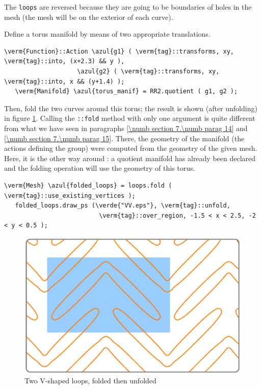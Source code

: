 The {\small\tt loops} are reversed because they are going to be boundaries of holes
in the mesh (the mesh will be on the exterior of each curve).

Define a torus manifold by means of two appropriate translations.

\begin{Verbatim}[commandchars=\\\{\},formatcom=\small\tt,frame=single,
   label=code not working,rulecolor=\color{coment},
   baselinestretch=0.94,framesep=2mm                                   ]
   \verm{Function}::Action \azul{g1} ( \verm{tag}::transforms, xy, \verm{tag}::into, (x+2.3) && y ),
                    \azul{g2} ( \verm{tag}::transforms, xy, \verm{tag}::into, x && (y+1.4) );
   \verm{Manifold} \azul{torus_manif} = RR2.quotient ( g1, g2 );
\end{Verbatim}

Then, fold the two curves around this torus; the result is shown (after unfolding) in figure
\ref{\numb section 7.\numb fig 13}.
Calling the {\small\tt{}::fold} method with only one argument is quite different
from what we have seen in paragraphs \ref{\numb section 7.\numb parag 14} and
\ref{\numb section 7.\numb parag 15}.
There, the geometry of the manifold (the actions defining the group) were computed from
the geometry of the given mesh.
Here, it is the other way around : a quotient manifold has already been declared and
the folding operation will use the geometry of this torus.

\begin{Verbatim}[commandchars=\\\{\},formatcom=\small\tt,frame=single,
   label=code not working,rulecolor=\color{coment},
   baselinestretch=0.94,framesep=2mm                                   ]
   \verm{Mesh} \azul{folded_loops} = loops.fold ( \verm{tag}::use_existing_vertices );
   folded_loops.draw_ps (\verde{"VV.eps"}, \verm{tag}::unfold,
                          \verm{tag}::over_region, -1.5 < x < 2.5, -2 < y < 0.5 );
\end{Verbatim}

\begin{figure}[ht] \centering
  \includegraphics[width=120mm]{boomerang-2.eps}
  \caption{Two V-shaped loops, folded then unfolded}
  \label{\numb section 7.\numb fig 13}
\end{figure}

